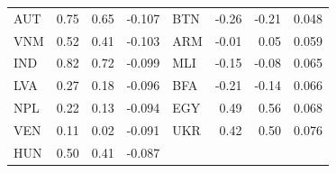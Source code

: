 \begin{tabular}{lrrr@{\hskip 2em}lrrr}
AUT & 0.75 & 0.65 & -0.107 & BTN & -0.26 & -0.21 & 0.048 \\
VNM & 0.52 & 0.41 & -0.103 & ARM & -0.01 & 0.05 & 0.059 \\
IND & 0.82 & 0.72 & -0.099 & MLI & -0.15 & -0.08 & 0.065 \\
LVA & 0.27 & 0.18 & -0.096 & BFA & -0.21 & -0.14 & 0.066 \\
NPL & 0.22 & 0.13 & -0.094 & EGY & 0.49 & 0.56 & 0.068 \\
VEN & 0.11 & 0.02 & -0.091 & UKR & 0.42 & 0.50 & 0.076 \\
HUN & 0.50 & 0.41 & -0.087 &  & & &  \\
\bottomrule
\end{tabular}
